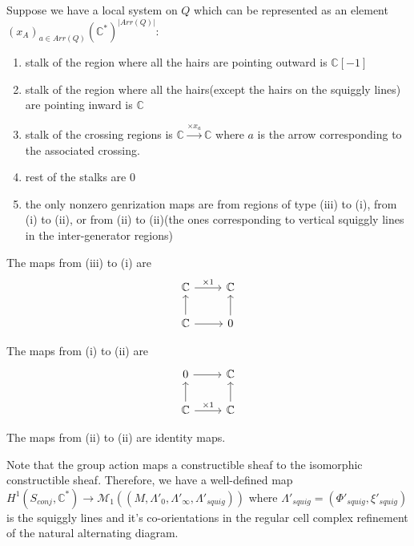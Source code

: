 \begin{definition}
Suppose we have a local system on $Q$ which can be represented as an element $(x_A)_{a\in Arr(Q)}(\mathbb{C}^*)^{|Arr(Q)|}$:

\begin{enumerate}[label= (\roman*)]
\item stalk of the region where all the hairs are pointing outward is $\mathbb{C}[-1]$

\item stalk of the region where all the hairs(except the hairs on the squiggly lines) are pointing inward is $\mathbb{C}$

\item stalk of the crossing regions is $\mathbb{C}\xrightarrow{\times x_a}\mathbb{C}$ where $a$ is the arrow corresponding to the associated crossing.

\item rest of the stalks are $0$

\item the only nonzero genrization maps are from regions of type (\Rn{3}) to (\Rn{1}), from (\Rn{1}) to (\Rn{2}), or from (\Rn{2}) to (\Rn{2})(the ones corresponding to vertical squiggly lines in the inter-generator regions)
\end{enumerate}

The maps from (\Rn{3}) to (\Rn{1}) are
\[
  \begin{tikzcd}
    \mathbb{C} \arrow{r}{\times 1} & \mathbb{C} \\
    \mathbb{C}\arrow{u}{} \arrow{r}{}& 0\arrow{u}{}
  \end{tikzcd}
\]

The maps from (\Rn{1}) to (\Rn{2}) are
\[
  \begin{tikzcd}
	0 \arrow{r}{} & \mathbb{C} \\
    \mathbb{C}\arrow{u}{} \arrow{r}{\times 1}& \mathbb{C}\arrow{u}{}
  \end{tikzcd}
\]

The maps from (\Rn{2}) to (\Rn{2}) are identity maps.
\end{definition}

Note that the group action maps a constructible sheaf to the isomorphic constructible sheaf. Therefore, we have a well-defined map
$H^1(S_{conj},\mathbb{C}^*)\rightarrow \mathcal{M}_1((M,\Lambda'_0,\Lambda'_\infty, \Lambda'_{squig}))$ where $\Lambda'_{squig} = (\Phi'_{squig}, \xi'_{squig})$ is the squiggly lines and it's co-orientations in the regular cell complex refinement of the natural alternating diagram.